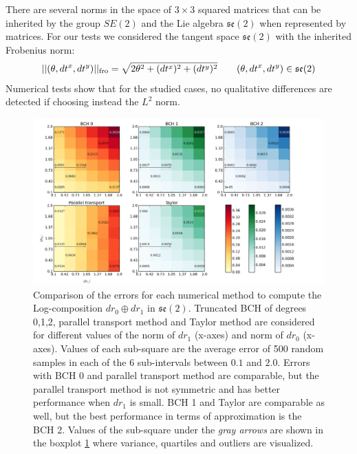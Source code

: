 There are several norms in the space of $3\times 3$ squared matrices that can be inherited by the group $SE(2)$ and the Lie algebra $\mathfrak{se}(2)$ when represented by matrices. For our tests we considered the tangent space $\mathfrak{se}(2)$ with the inherited Frobenius norm:
\begin{align*}
\vert\lvert (\theta,dt^{x},dt^{y}) \rvert\vert_{\text{fro}} = \sqrt{2\theta^{2} + (dt^{x})^2 + (dt^{y})^2} 
\qquad
(\theta,dt^{x},dt^{y}) \in \mathfrak{se}(2)
\end{align*}
Numerical tests show that for the studied cases, no qualitative differences are detected if choosing instead the $L^{2}$ norm.
 \begin{figure}[!ht]
 	\hspace{-2cm}
 	\includegraphics[scale=0.54]{figures/se2_image_scale.png}
 	\caption{Comparison of the errors for each numerical method to compute the Log-composition $dr_{0} \oplus dr_{1}$ in $\mathfrak{se}(2)$. Truncated BCH of degrees 0,1,2, parallel transport method and Taylor method are considered for different values of the norm of $dr_{1}$ (x-axes) and norm of $dr_{0}$ (x-axes). 
 	Values of each sub-square are the average error of 500 random samples in each of the 6 sub-intervals between $0.1$ and $2.0$. Errors with BCH 0 and parallel transport method are comparable, but the parallel transport method is not symmetric and has better performance when $dr_{1}$ is small. BCH 1 and Taylor are comparable as well, but the best performance in terms of approximation is the BCH 2. Values of the sub-square under the \emph{gray arrows} are shown in the boxplot \ref{fig:se2_image_scale} where variance, quartiles and outliers are visualized.
 	 }
 	\label{fig:se2_image_scale}
 \end{figure}
